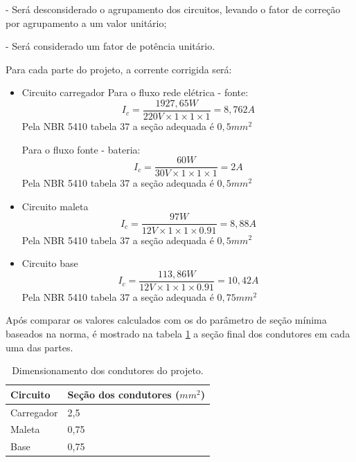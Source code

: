 - Será desconsiderado o agrupamento dos circuitos, levando o fator de correção por agrupamento a um valor unitário; 

- Será considerado um fator de potência unitário.


Para cada parte do projeto, a corrente corrigida será:

\begin{itemize}
    \item Circuito carregador
    Para o fluxo rede elétrica - fonte:
\begin{equation}
    I_{c} = \frac{1927,65W}{220V \times 1 \times 1 \times 1} = 8,762A
\end{equation}
Pela NBR 5410 tabela 37 a seção adequada é $0,5mm^2$

    Para o fluxo fonte - bateria:
\begin{equation}
    I_{c} = \frac{60W}{30V \times 1 \times 1 \times 1} = 2A
\end{equation}
Pela NBR 5410 tabela 37 a seção adequada é $0,5mm^2$  

    \item Circuito maleta
  \begin{equation}
    I_{c} = \frac{97W}{12V \times 1 \times 1 \times 0.91} = 8,88A
\end{equation}
Pela NBR 5410 tabela 37 a seção adequada é $0,5mm^2$  
        \item Circuito base
  \begin{equation}
    I_{c} = \frac{113,86W}{12V \times 1 \times 1 \times 0.91} = 10,42A
\end{equation}
Pela NBR 5410 tabela 37 a seção adequada é $0,75mm^2$ 
\end{itemize}

Após comparar os valores calculados com os do parâmetro de seção mínima baseados na norma, é mostrado na tabela \ref{tab:condutores} a seção final dos condutores em cada uma das partes.

\begin{center}
\begin{table}[H]
\centering
\begin{tabular}{ |m{5cm}|m{5cm}|} 
\hline
\textbf{ Circuito }&\textbf{ Seção dos condutores ($mm^2$)}\\ 
 \hline
 Carregador & 2,5 \\ 
 \hline
 Maleta & 0,75 \\
 \hline
Base & 0,75  \\ 
 \hline
\end{tabular}
\caption{Dimensionamento dos condutores do projeto.}
\label{tab:condutores}
\end{table}
\end{center}


